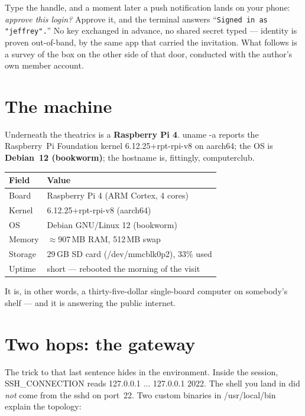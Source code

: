 \documentclass[10pt,letterpaper,twocolumn]{article}
\newcommand{\code}[1]{{\ttfamily\small\colorbox{codebg}{#1}}}
\newcommand{\fp}[1]{{\ttfamily\small\color{acdark}#1}}
\begin{document}
Type the handle, and a moment later a push notification lands on your phone:
\emph{approve this login?} Approve it, and the terminal answers
``\texttt{Signed in as "jeffrey".}'' No key exchanged in advance, no shared
secret typed --- identity is proven out-of-band, by the same app that carried
the invitation. What follows is a survey of the box on the other side of that
door, conducted with the author's own member account.

\section{The machine}

Underneath the theatrics is a \textbf{Raspberry Pi 4}. \code{uname -a} reports
the Raspberry~Pi Foundation kernel \fp{6.12.25+rpt-rpi-v8} on \fp{aarch64};
the OS is \textbf{Debian~12 (bookworm)}; the hostname is, fittingly,
\fp{computerclub}.

\begin{center}
\small
\begin{tabularx}{\columnwidth}{@{}lX@{}}
\toprule
\textbf{Field} & \textbf{Value} \\
\midrule
Board      & Raspberry Pi 4 (ARM Cortex, 4 cores) \\
Kernel     & 6.12.25+rpt-rpi-v8 (aarch64) \\
OS         & Debian GNU/Linux 12 (bookworm) \\
Memory     & $\approx$907\,MB RAM, 512\,MB swap \\
Storage    & 29\,GB SD card (\fp{/dev/mmcblk0p2}), 33\% used \\
Uptime     & short --- rebooted the morning of the visit \\
\bottomrule
\end{tabularx}
\end{center}

It is, in other words, a thirty-five-dollar single-board computer on somebody's
shelf --- and it is answering the public internet.

\section{Two hops: the gateway}

The trick to that last sentence hides in the environment. Inside the session,
\fp{SSH\_CONNECTION} reads \fp{127.0.0.1 ... 127.0.0.1 2022}. The shell you
land in did \emph{not} come from the sshd on port~22. Two custom binaries in
\fp{/usr/local/bin} explain the topology:
\end{document}
